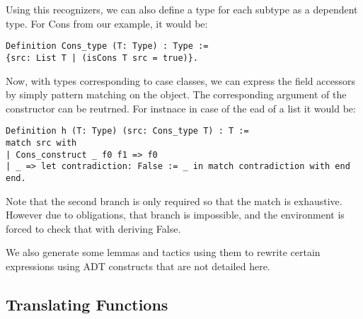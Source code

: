 Using this recognizers, we can also define a type for each subtype as a dependent type. For Cons from our example, it would be:

\begin{lstlisting}[style=myCoqstyle]  
Definition Cons_type (T: Type) : Type :=
{src: List T | (isCons T src = true)}. 
\end{lstlisting}

Now, with types corresponding to case classes,  we can express the field accessors by simply pattern matching on the object. The corresponding argument of the constructor can be reutrned. For instnace in case of the ead of a list it would be:

\begin{lstlisting}[style=myCoqstyle]  
Definition h (T: Type) (src: Cons_type T) : T :=
match src with
| Cons_construct _ f0 f1 => f0
| _ => let contradiction: False := _ in match contradiction with end
end. 
\end{lstlisting}

Note that the second branch is only required so that the match is exhaustive. However due to obligations, that branch is impossible, and the environment is forced to check that with deriving False. 

We also generate some lemmas and tactics using them to rewrite certain expressions using ADT constructs that are not detailed here. %


\subsection{Translating Functions}